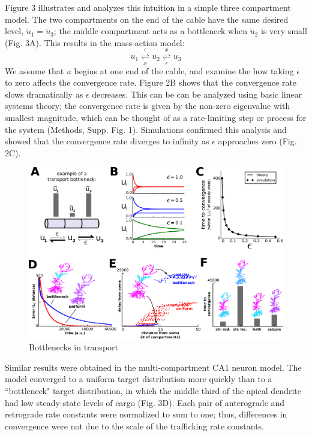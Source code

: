 \documentclass[fleqn,10pt]{wlpeerj}
\begin{document}
Figure 3 illustrates and analyzes this intuition in a simple three compartment model. The two compartments on the end of the cable have the same desired level, $\tilde{u}_1 = \tilde{u}_3$; the middle compartment acts as a bottleneck when $\tilde{u}_2$ is very small (Fig. 3A). This results in the mass-action model:
$$
u_1 \underset{x}{\overset{\epsilon}{\rightleftharpoons}} u_2 \underset{\epsilon}{\overset{x}{\rightleftharpoons}} u_3
$$
We assume that $u$ begins at one end of the cable, and examine the how taking $\epsilon$ to zero affects the convergence rate. Figure 2B shows that the convergence rate slows dramatically as $\epsilon$ decreases. This can be can be analyzed using basic linear systems theory; the convergence rate is given by the non-zero eigenvalue with smallest magnitude, which can be thought of as a rate-limiting step or process for the system (Methods, Supp. Fig. 1). Simulations confirmed this analysis and showed that the convergence rate diverges to infinity as $\epsilon$ approaches zero (Fig. 2C).

\begin{figure}[h!]
\begin{center}
\includegraphics[width=1\columnwidth]{03_convergence.png}
\caption{Bottlenecks in transport}
\end{center}
\end{figure}

Similar results were obtained in the multi-compartment CA1 neuron model. The model converged to a uniform target distribution more quickly than to a ``bottleneck" target distribution, in which the middle third of the apical dendrite had low steady-state levels of cargo (Fig. 3D). Each pair of anterograde and retrograde rate constants were normalized to sum to one; thus, differences in convergence were not due to the scale of the trafficking rate constants.
\end{document}
